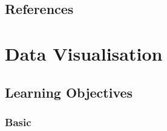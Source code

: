 \documentclass[
  oneside]{book}
\begin{document}
\hypertarget{references}{%
\section{References}\label{references}}

\hypertarget{ggplot}{%
\chapter{Data Visualisation}\label{ggplot}}

\hypertarget{ilo_ggplot}{%
\section{Learning Objectives}\label{ilo_ggplot}}

\hypertarget{basic-1}{%
\subsection{Basic}\label{basic-1}}
\end{document}
